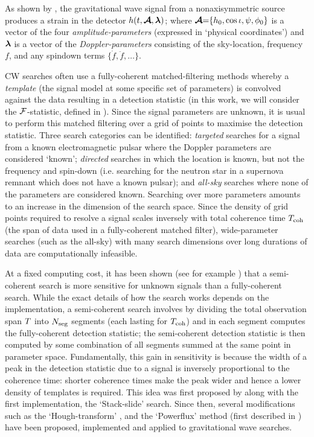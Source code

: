 \documentclass[aps, prd, twocolumn, superscriptaddress, floatfix, showpacs, nofootinbib, longbibliography]{revtex4-1}
\begin{document}
As shown by \citet{jks1998}, the gravitational wave signal from a
nonaxisymmetric source produces a strain in the detector $h(t, \boldsymbol{\mathcal{A}}, \boldsymbol{\mathbf{\lambda}})$;
where $\boldsymbol{\mathcal{A}}{=}\{h_0, \cos\iota, \psi, \phi_0\}$ is a vector of the four
\emph{amplitude-parameters} (expressed in `physical coordinates') and
$\boldsymbol{\mathbf{\lambda}}$ is a vector of the \emph{Doppler-parameters} consisting of the
sky-location, frequency $f$, and any spindown terms $\{\dot{f}, \ddot{f},
\ldots\}$.

CW searches often use a fully-coherent matched-filtering methods whereby a
\emph{template} (the signal model at some specific set of parameters) is
convolved against the data resulting in a detection statistic (in this work, we
will consider the ${\mathcal{F}}$-statistic, defined in \citet{jks1998}). Since the signal
parameters are unknown, it is usual to perform this matched filtering over a
grid of points to maximise the detection statistic.  Three search categories
can be identified: \emph{targeted} searches for a signal from a known
electromagnetic pulsar where the Doppler parameters are considered `known';
\emph{directed} searches in which the location is known, but not the frequency
and spin-down (i.e.  searching for the neutron star in a supernova remnant
which does not have a known pulsar); and \emph{all-sky} searches where none of
the parameters are considered known.  Searching over more parameters amounts to
an increase in the dimension of the search space. Since the density of grid
points required to resolve a signal scales inversely with total coherence time
$T_{\rm coh}$ (the span of data used in a fully-coherent matched filter),
wide-parameter searches (such as the all-sky) with many search dimensions over
long durations of data are computationally infeasible.

At a fixed computing cost, it has been shown (see for example \citep{brady1998,
prix2012}) that a semi-coherent search is more sensitive for unknown signals
than a fully-coherent search. While the exact details of how the search works
depends on the implementation, a semi-coherent search involves by dividing the
total observation span $T$ into $N_{\rm seg}$ segments (each lasting for
$T_{\rm coh}$) and in each segment computes the fully-coherent detection statistic;
the semi-coherent detection statistic is then computed by some combination of
all segments summed at the same point in parameter space. Fundamentally, this
gain in sensitivity is because the width of a peak in the detection statistic
due to a signal is inversely proportional to the coherence time: shorter
coherence times make the peak wider and hence a lower density of templates is
required.  This idea was first proposed by \citet{brady2000} along with the
first implementation, the `Stack-slide' search. Since then, several
modifications such as the `Hough-transform' \citep{krishnan2004, astone2014},
and the `Powerflux' method (first described in \citet{allyskyS42008}) have been
proposed, implemented and applied to gravitational wave searches.
\end{document}
